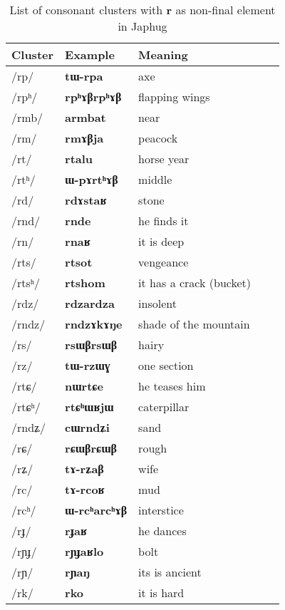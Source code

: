\documentclass[oneside,a4paper,11pt]{article}
\newcommand{\ipa}[1]{{\phon\mbox{\textbf{#1}}}}
\newcommand{\deux}[1]{/#1/}
\newcommand{\idph}[1]{\cellcolor{gray}\textbf{#1}}
\begin{document}
\begin{table}[H]
\caption{List of consonant clusters with \ipa{r} as non-final element in Japhug} \label{tab:rC} \centering
\begin{tabular}{lllll}
\toprule
Cluster &Example &Meaning \\
\midrule
\deux{rp}  	&	 \ipa{tɯ-rpa}  	&	 axe 	\\
 \deux{rpʰ} \idph{}  	&	 \ipa{rpʰɤβrpʰɤβ}  	&	 flapping wings 	\\
 \deux{rmb}  	&	 \ipa{armbat}  	&	near  	\\
 \deux{rm}  	&	 \ipa{rmɤβja}  	&	peacock  	\\
 \deux{rt}  	&	 \ipa{rtalu}  	&	horse year  	\\
 \deux{rtʰ}  	&	 \ipa{ɯ-pɤrtʰɤβ}  	&	middle  	\\
 \deux{rd}  	&	 \ipa{rdɤstaʁ}  	&	 stone 	\\
 \deux{rnd}  	&	 \ipa{rnde}  	&	 he finds it 	\\
 \deux{rn}  	&	 \ipa{rnaʁ}  	&	it is deep  	\\
 \deux{rts}  	&	 \ipa{rtsot}  	&	vengeance  	\\
 \deux{rtsʰ}  	&	 \ipa{rtshom}  	&	 it has a crack (bucket) 	\\
 \deux{rdz} \idph{}  	&	 \ipa{rdzardza}  	&	 insolent 	\\
 \deux{rndz}  	&	 \ipa{rndzɤkɤŋe}  	&	 shade of the mountain 	\\
 \deux{rs} \idph{}  	&	 \ipa{rsɯβrsɯβ}  	&	 hairy 	\\
 \deux{rz}  	&	 \ipa{tɯ-rzɯɣ}  	&	 one section 	\\
 \deux{rtɕ}  	&	 \ipa{nɯrtɕe}  	&	he teases him  	\\
 \deux{rtɕʰ}  	&	 \ipa{rtɕʰɯʁjɯ}  	&	caterpillar  	\\
 \deux{rndʑ}  	&	 \ipa{cɯrndʑi}  	&	sand  	\\
 \deux{rɕ}  	&	 \ipa{rɕɯβrɕɯβ}  	&	rough 	\\
 \deux{rʑ}  	&	 \ipa{tɤ-rʑaβ}  	&	wife  	\\
 \deux{rc}  	&	 \ipa{tɤ-rcoʁ}  	&	 mud 	\\
 \deux{rcʰ}  	&	 \ipa{ɯ-rcʰarcʰɤβ}  	&	 interstice 	\\
 \deux{rɟ}  	&	 \ipa{rɟaʁ}  	&	he dances  	\\
 \deux{rɲɟ}  	&	 \ipa{rɲɟaʁlo}  	&	 bolt 	\\
 \deux{rɲ}  	&	 \ipa{rɲaŋ}  	&	 its is ancient 	\\
 \deux{rk}  	&	 \ipa{rko}  	&	 it is hard 	\\

\end{tabular}
\end{table}
\end{document}
